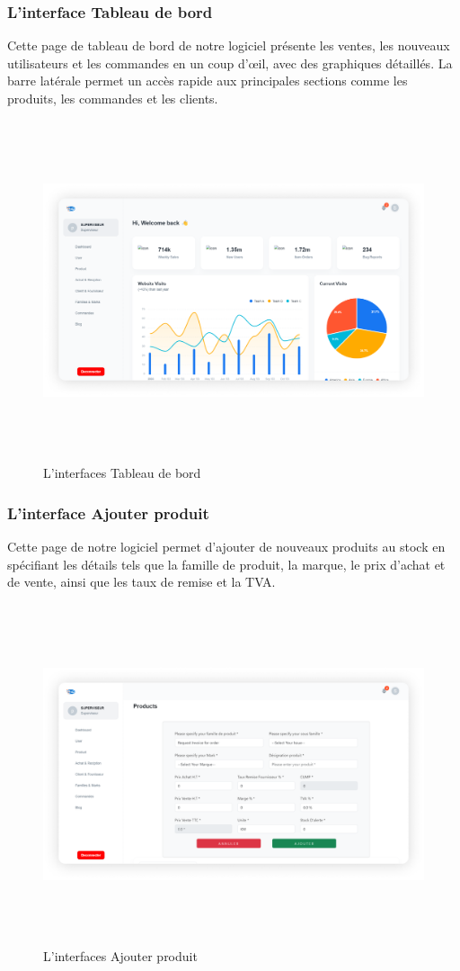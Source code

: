 \documentclass[edit,12pt,a4paper,ChapStyle,oneside,doubleinterligne]{report}
\begin{document}
\subsubsection{L'interface Tableau de bord}
Cette page de tableau de bord de notre logiciel présente les ventes, les nouveaux utilisateurs et les commandes en un coup d'œil, avec des graphiques détaillés. La barre latérale permet un accès rapide aux principales sections comme les produits, les commandes et les clients.
  \begin{figure} [H]
    \centering
    \includegraphics[width = 15.319375cm , height = 10cm , angle=360]{images/dashbord 1.png}
    \caption{L'interfaces Tableau de bord}
    \label{fig:Tableau de bordr}
\end{figure}
\subsubsection{L'interface Ajouter produit}
Cette page de notre logiciel permet d'ajouter de nouveaux produits au stock en spécifiant les détails tels que la famille de produit, la marque, le prix d'achat et de vente, ainsi que les taux de remise et la TVA.
  \begin{figure} [H]
    \centering
    \includegraphics[width = 15.319375cm , height = 10cm , angle=360]{images/ajouter produit 1.png}
    \caption{L'interfaces Ajouter produit}
    \label{fig:Ajouter produit}
\end{figure}
\end{document}
